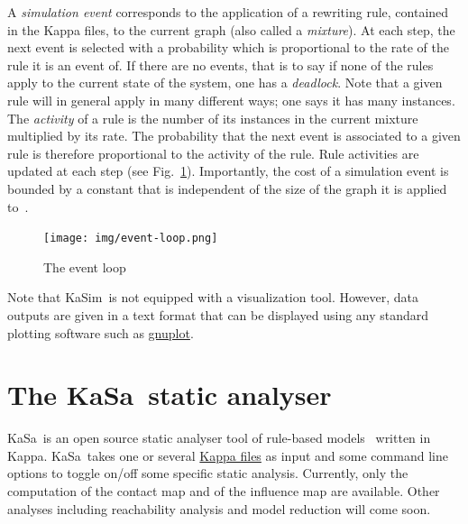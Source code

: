 \documentclass[11pt]{book}
\def\KaSim{\textsf{KaSim}}
\def\KaSa{\textsf{KaSa}}
\def\ie{ie }
\begin{document}
A \emph{simulation event} corresponds to the application of a rewriting rule, contained in the Kappa files, to the current graph (also called a \emph{mixture}). 
At each step, the next event %
is selected with a probability which is proportional to the rate of the rule it is an event of.
If there are no events, that is to say if none of the rules apply to the current state of the system, one has a \emph{deadlock}. Note that a given rule will in general apply in many different ways; one says it has many instances. The \emph{activity} of a rule is the number of its instances in the current mixture multiplied by its rate. The probability that the next event is associated to a given rule is therefore proportional to the activity of the rule.
Rule activities are updated at
each step (see Fig.~\ref{fig:event-loop}). Importantly, the cost of a simulation event is bounded by a constant that is independent of the size of the graph it is applied to~\cite{Dan_etal07b}. 

\begin{figure}[htbp]
\begin{center}
\texttt{[image: img/event-loop.png]}
\caption{The event loop}
\label{fig:event-loop}
\end{center}
\end{figure}

Note that \KaSim~is not equipped with a %
visualization tool. However, data outputs are given in a text format that can be displayed using any standard plotting software such as \href{http://www.gnuplot.info/}{gnuplot}.

\section{The \KaSa~static analyser}

\KaSa~is an open source static analyser  tool of rule-based models~\cite{DanLan04,Dan_etal07a,Fae_etal05} written in Kappa. \KaSa~takes one or several \hyperref[chap:kappa]{Kappa files} as input and some command line options to toggle on/off some specific static analysis. Currently, only the computation of the contact map and of the influence map are available. Other analyses including reachability analysis \cite{Feret-ICCMSE2007,DanosEtAl-VMCAI08} and model reduction \cite{Feret-et-al-pnas2009,DanosEtAl-LICS2010,Feret-MFPSXXVII} will come soon. 
\end{document}
